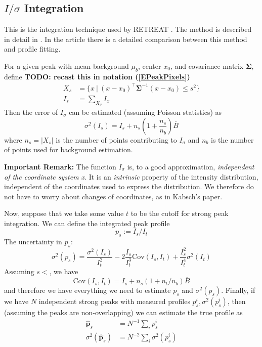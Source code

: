 \documentclass[11pt,a4paper]{article}
\let\oldhat\hat
\renewcommand{\hat}[1]{\oldhat{\mathbf{#1}}}
\def\v#1{\bm{{#1}}}
\def\tr{^\intercal}
\def\cov{\mathrm{Cov}}
\begin{document}
\subsection{\boldmath$I/\sigma$ Integration}

This is the integration technique used by RETREAT \cite{StMc13}. The method is described in detail in \cite{WiKS88}.
In the article \cite{PrWM97} there is a detailed comparison between this method and profile fitting.

For a given peak with mean background $\mu_b$, center $x_0$, and covariance matrix $\v\Sigma$,
define
\textbf{TODO: recast this in notation (\ref{EPeakPixels})}
\begin{align}
  X_s &= \{ x \ | \ (x-x_0)\tr\v\Sigma^{-1}(x-x_0) \leq s^2\} \\
  I_s &= \sum_{X_\sigma} I_x
\end{align}
Then the error of $I_\sigma$ can be estimated (assuming Poisson statistics) as
\begin{equation}
  \sigma^2(I_s) = I_s + n_s(1+\frac{n_s}{n_b}) \overline{B}
\end{equation}
where $n_s = |X_s|$ is the number of points contributing to $I_\sigma$ and $n_b$ is the number of points used for background estimation.

\textbf{Important Remark:} The function $I_\sigma$ is, to a good approximation, \emph{independent of the coordinate system x}.
It is an \emph{intrinsic} property of the intensity distribution, independent of the coordinates used to express the distribution.
We therefore do not have to worry about changes of coordinates, as in Kabsch's paper.


Now, suppose that we take some value $t$ to be the cutoff for strong peak integration. We can define the integrated peak profile
\begin{equation}
  p_s := I_s / I_t
\end{equation}
The uncertainty in $p_s$:
\begin{equation}
  \sigma^2(p_s)
  = \frac{\sigma^2(I_s)}{I_t^2} - 2 \frac{I_s}{I_t^3} \cov(I_s, I_t)
    + \frac{I_s^2}{I_t^4} \sigma^2(I_t)
\end{equation}
Assuming $s < $, we have
\begin{equation}
  \cov(I_s, I_t) = I_s + n_s(1+n_t/n_b)\overline{B}
\end{equation}
and therefore we have everything we need to estimate $p_s$ and $\sigma^2(p_s)$. Finally, if we have $N$ independent strong
peaks with measured profiles $p^i_s, \sigma^2(p^i_s)$, then (assuming the peaks are non-overlapping) we can estimate the
true profile as
\begin{align}
  \hat{p}_s &= N^{-1} \sum_i p^i_s \\
 \sigma^2(\hat{p}_s) &= N^{-2} \sum_i \sigma^2(p^i_s)
\end{align}
\end{document}
